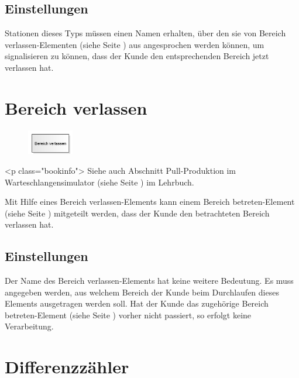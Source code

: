 \subsection*{Einstellungen}

Stationen dieses Typs müssen einen Namen erhalten, über den sie von
Bereich verlassen-Elementen (siehe Seite \pageref{ref:ModelElementSectionEnd}) 
aus angesprochen werden können, um signalisieren zu können, dass der
Kunde den entsprechenden Bereich jetzt verlassen hat.


\section{Bereich verlassen}
\label{ref:ModelElementSectionEnd}

\begin{figure}
\vspace{-22pt}
\includegraphics[width=2cm]{imageModelElementSectionEnd.png}
\vspace{-22pt}
\end{figure}

<p class="bookinfo">
Siehe auch Abschnitt Pull-Produktion im Warteschlangensimulator (siehe Seite \pageref{ref:book:7.6.3}) im Lehrbuch.

Mit Hilfe eines Bereich verlassen-Elements kann einem
Bereich betreten-Element (siehe Seite \pageref{ref:ModelElementSectionStart}) 
mitgeteilt werden, dass der Kunde den betrachteten Bereich verlassen hat.

\subsection*{Einstellungen}

Der Name des Bereich verlassen-Elements hat keine weitere Bedeutung.
Es muss angegeben werden, aus welchem Bereich der Kunde beim Durchlaufen dieses
Elements ausgetragen werden soll. Hat der Kunde das zugehörige
Bereich betreten-Element (siehe Seite \pageref{ref:ModelElementSectionStart}) 
vorher nicht passiert, so erfolgt keine Verarbeitung.


\section{Differenzzähler}
\label{ref:ModelElementDifferentialCounter}


